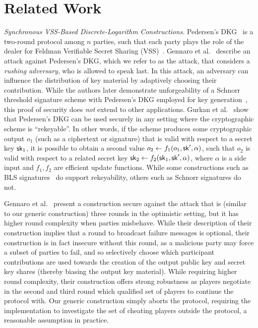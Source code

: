 \section{Related Work}
\label{related}

\noindent\textit{Synchronous VSS-Based Discrete-Logarithm Constructions.}
Pedersen's DKG~\cite{Pedersen91} is a two-round protocol among $n$ parties,
such that each party plays the role of the dealer for Feldman Verifiable Secret
Sharing (VSS)~\cite{Feldman87}.
Gennaro et al.~\cite{GennaroJKR07} describe an attack against Pedersen's DKG, which we refer to as the \GJKRAttack attack,
that considers a \emph{rushing adversary}, who is allowed to speak last.
In this attack,
an adversary can influence the distribution of key material
by adaptively choosing their contribution.
While the authors later demonstrate unforgeability of a Schnorr threshold signature scheme with  Pedersen's DKG employed for key generation~\cite{GennaroJKR03},
this proof of security does \emph{not} extend to other applications.
%
Gurkan et al.~\cite{GurkanJMMST21} show that Pedersen's DKG can be used securely in any setting where the cryptographic scheme is ``rekeyable''.
In other words,
if the scheme produces some cryptographic output
$o_1$ (such as a ciphertext or signature) that is valid with respect to a secret key $\mathsf{sk}_1$,
it is possible to obtain a second value $o_2 \gets f_1(o_1, \mathsf{sk}', \alpha)$,
such that $o_2$ is valid with respect to a related secret key $\mathsf{sk}_2 \gets f_2(\mathsf{sk}_1, \mathsf{sk}', \alpha)$,
where $\alpha$ is a side input and $f_1, f_2$ are efficient update functions.
While some constructions such as BLS signatures~\cite{BonehLS04} do support rekeyability,
others such as Schnorr signatures do not.

Gennaro et al.~\cite{GennaroJKR07} present a construction secure against the
\GJKRAttack attack
that is (similar to our generic construction) three rounds in the optimistic setting,
but it has higher round complexity when parties misbehave.
While their description of their construction implies that a round to broadcast failure messages is optional,
their construction is in fact insecure without this round,
as a malicious party may force a subset of parties to fail,
and so selectively choose which participant contributions are used towards the
creation of the output public key and secret key shares
(thereby biasing the output key material).
While requiring higher round complexity,
their construction offers strong robustness as players negotiate in the second
and third round which qualified set of players to continue the protocol with.
Our generic construction simply aborts the protocol,
requiring the implementation to investigate the set of cheating players outside
the protocol, a reasonable assumption in practice.

